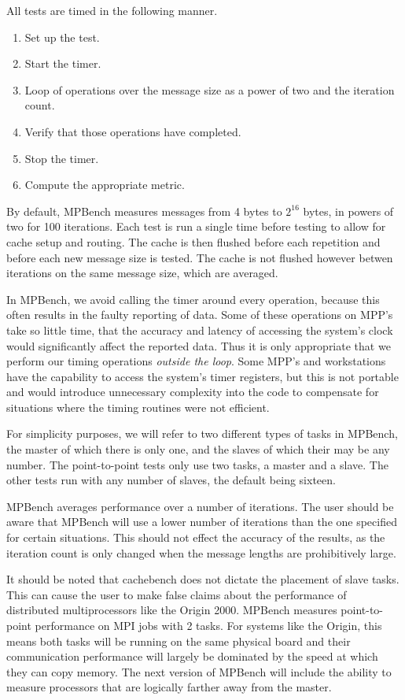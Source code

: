 \documentclass [12pt]{article}
\begin{document}
All tests are timed in the following manner.
\begin{enumerate}
\item Set up the test.
\item Start the timer.
\item Loop of operations over the message size as a power of two 
and the iteration count.
\item Verify that those operations have completed.
\item Stop the timer.
\item Compute the appropriate metric.
\end{enumerate}

By default, MPBench measures messages from 4 bytes to $ 2^{16} $ bytes, in 
powers of two for 100 iterations.  Each test is run a single time before testing 
to allow for cache setup and routing.  The cache is then flushed before each repetition 
and before each new message size is tested.  The cache is not flushed however betwen 
iterations on the same message size, which are averaged. 

In MPBench, we avoid calling the timer around every operation, because
this often results in the faulty reporting of data. Some of these
operations on MPP's take so little time, that the accuracy and latency
of accessing the system's clock would significantly affect the
reported data. Thus it is only appropriate that we perform our timing
operations {\em outside the loop}. Some MPP's and workstations have
the capability to access the system's timer registers, but this is not
portable and would introduce unnecessary complexity into the code to
compensate for situations where the timing routines were not
efficient.

For simplicity purposes, we will refer to two different types of tasks in
MPBench, the master of which there is only one, and the slaves of
which their may be any number. The point-to-point tests only use two
tasks, a master and a slave. The other tests run with any number of
slaves, the default being sixteen.

MPBench averages performance over a number of iterations. The user
should be aware that MPBench will use a lower number of iterations
than the one specified for certain situations. This should not effect
the accuracy of the results, as the iteration count is only changed
when the message lengths are prohibitively large. 

It should be noted that cachebench does not dictate the placement of slave
tasks. This can cause the user to make false claims about the performance
of distributed multiprocessors like the Origin 2000. MPBench measures 
point-to-point performance on MPI jobs with 2 tasks. For systems like the
Origin, this means both tasks will be running on the same physical board and
their communication performance will largely be dominated by the speed at
which they can copy memory. The next version of MPBench will include the
ability to measure processors that are logically farther away from the master.
\end{document}
